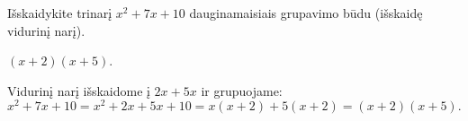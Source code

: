 \begin{salyga}
Išskaidykite trinarį $x^2 + 7x + 10$ dauginamaisiais grupavimo būdu (išskaidę vidurinį narį).
\end{salyga}

\begin{atsakymas}
$(x+2)(x+5)$.
\end{atsakymas}

\begin{sprendimas}
Vidurinį narį išskaidome į $2x+5x$ ir grupuojame:
\[
x^2+7x+10=x^2+2x+5x+10=x(x+2)+5(x+2)=(x+2)(x+5).
\]
\end{sprendimas}
